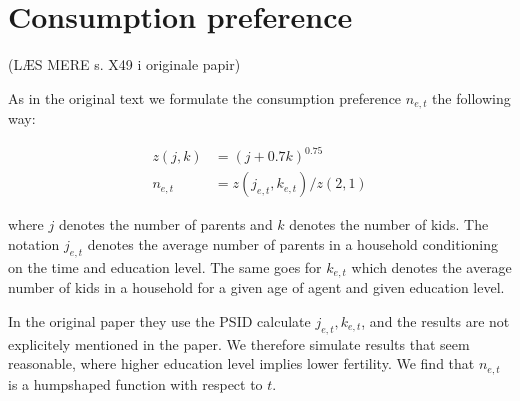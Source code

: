 \section{Consumption preference}

(LÆS MERE s. X49 i originale papir)

As in the original text we formulate the consumption preference $n_{e,t}$ the following way:

\begin{align}
    z(j, k ) &= (j + 0.7 k)^{0.75} \\
    n_{e, t} &= z(j_{e,t}, k_{e,t}) / z(2, 1)
\end{align}

where $j$ denotes the number of parents and $k$ denotes the number of kids. The notation $j_{e,t}$ denotes the average number of parents in a household conditioning on the time and education level. The same goes for $k_{e,t}$ which denotes the average number of kids in a household for a given age of agent and given education level.

In the original paper they use the PSID calculate $j_{e,t}, k_{e,t}$, and the results are not explicitely mentioned in the paper. We therefore simulate results that seem reasonable, where higher education level implies lower fertility. We find that $n_{e,t}$ is a humpshaped function with respect to $t$.
